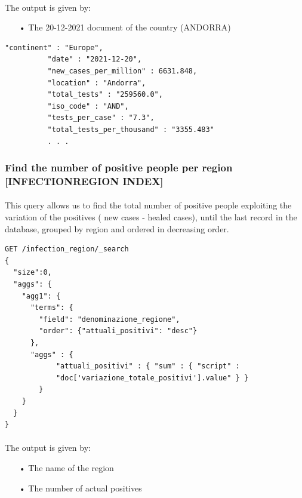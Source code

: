 \documentclass[a4paper,12pt]{article}
\begin{document}
\paragraph{} The output is given by: 
\begin{itemize}[noitemsep]
\item[•] The 20-12-2021 document of the country (ANDORRA)
\end{itemize}

\begin{tcolorbox}[colback=red!5!white,colframe=red!75!black,title=OUTPUT]
\begin{verbatim}
"continent" : "Europe",
          "date" : "2021-12-20",
          "new_cases_per_million" : 6631.848,
          "location" : "Andorra",
          "total_tests" : "259560.0",
          "iso_code" : "AND",
          "tests_per_case" : "7.3",
          "total_tests_per_thousand" : "3355.483"
          . . .
\end{verbatim}
\end{tcolorbox}
\newpage

\subsubsection{Find the number of positive people per region [INFECTION\textunderscore REGION INDEX]  }
\paragraph{} This query allows us to find the total number of positive people exploiting the variation of the positives ( new cases - healed cases), until the last record in the database, grouped by region and ordered in decreasing order.
\begin{tcolorbox}[colback=green!5!white,colframe=green!75!black,title=QUERY]
\begin{verbatim}
GET /infection_region/_search
{ 
  "size":0,
  "aggs": {
    "agg1": {
      "terms": {
        "field": "denominazione_regione",
        "order": {"attuali_positivi": "desc"}
      },
      "aggs" : {
            "attuali_positivi" : { "sum" : { "script" : 
            "doc['variazione_totale_positivi'].value" } }
        }
    }
  }
}
\end{verbatim}
\end{tcolorbox}
\newpage

\paragraph{} The output is given by: 
\begin{itemize}[noitemsep]
\item[•] The name of the region
\item[•] The number of actual positives
\end{itemize}
\end{document}
